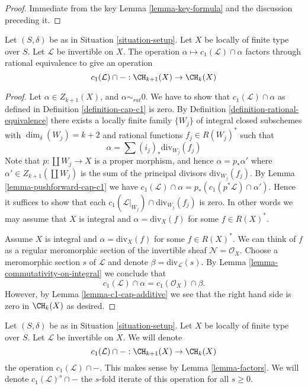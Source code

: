 \begin{proof}
Immediate from the key Lemma \ref{lemma-key-formula}
and the discussion preceding it.
\end{proof}

\begin{lemma}
\label{lemma-factors}
Let $(S, \delta)$ be as in Situation \ref{situation-setup}.
Let $X$ be locally of finite type over $S$.
Let $\mathcal{L}$ be invertible on $X$.
The operation $\alpha \mapsto c_1(\mathcal{L}) \cap \alpha$
factors through rational equivalence to give an operation
$$
c_1(\mathcal{L}) \cap - : \CH_{k + 1}(X) \to \CH_k(X)
$$
\end{lemma}

\begin{proof}
Let $\alpha \in Z_{k + 1}(X)$, and $\alpha \sim_{rat} 0$.
We have to show that $c_1(\mathcal{L}) \cap \alpha$
as defined in Definition \ref{definition-cap-c1} is zero.
By Definition \ref{definition-rational-equivalence} there
exists a locally finite family $\{W_j\}$ of integral closed
subschemes with $\dim_\delta(W_j) = k + 2$ and rational functions
$f_j \in R(W_j)^*$ such that
$$
\alpha = \sum (i_j)_*\text{div}_{W_j}(f_j)
$$
Note that $p : \coprod W_j \to X$ is a proper morphism,
and hence $\alpha = p_*\alpha'$ where $\alpha' \in Z_{k + 1}(\coprod W_j)$
is the sum of the principal divisors $\text{div}_{W_j}(f_j)$.
By Lemma \ref{lemma-pushforward-cap-c1} we have
$c_1(\mathcal{L}) \cap \alpha = p_*(c_1(p^*\mathcal{L}) \cap \alpha')$.
Hence it suffices to show that each
$c_1(\mathcal{L}|_{W_j}) \cap \text{div}_{W_j}(f_j)$ is zero.
In other words we may assume that $X$ is integral and
$\alpha = \text{div}_X(f)$ for some $f \in R(X)^*$.

\medskip\noindent
Assume $X$ is integral and $\alpha = \text{div}_X(f)$ for some $f \in R(X)^*$.
We can think of $f$ as a regular meromorphic section of the invertible
sheaf $\mathcal{N} = \mathcal{O}_X$. Choose a meromorphic section
$s$ of $\mathcal{L}$ and denote $\beta = \text{div}_\mathcal{L}(s)$.
By Lemma \ref{lemma-commutativity-on-integral}
we conclude that
$$
c_1(\mathcal{L}) \cap \alpha = c_1(\mathcal{O}_X) \cap \beta.
$$
However, by Lemma \ref{lemma-c1-cap-additive} we see that the right hand side
is zero in $\CH_k(X)$ as desired.
\end{proof}

\noindent
Let $(S, \delta)$ be as in Situation \ref{situation-setup}.
Let $X$ be locally of finite type over $S$.
Let $\mathcal{L}$ be invertible on $X$.
We will denote
$$
c_1(\mathcal{L}) \cap - : \CH_{k + 1}(X) \to \CH_k(X)
$$
the operation $c_1(\mathcal{L}) \cap - $. This makes sense by
Lemma \ref{lemma-factors}. We will denote $c_1(\mathcal{L})^s \cap -$
the $s$-fold iterate of this operation for all $s \geq 0$.


